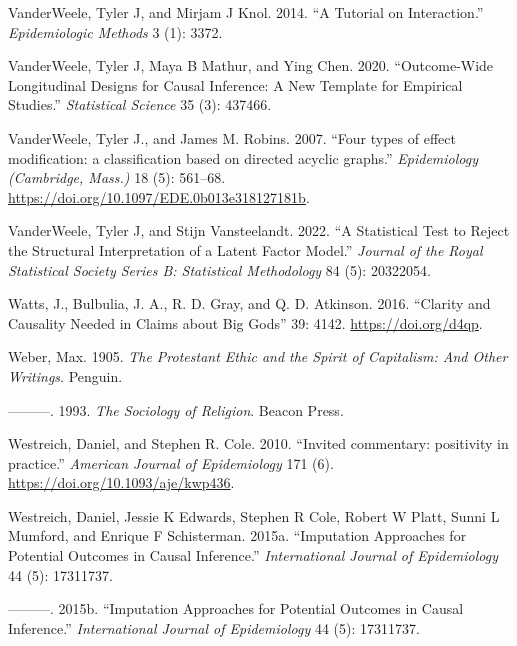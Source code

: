 \documentclass[
  singlecolumn]{report}
\newlength{\cslhangindent}
\newlength{\cslentryspacingunit} %
\newenvironment{CSLReferences}[2] %
 {%
  \setlength{\parindent}{0pt}
  \ifodd #1
  \let\oldpar\par
  \def\par{\hangindent=\cslhangindent\oldpar}
  \fi
  \setlength{\parskip}{#2\cslentryspacingunit}
 }%
 {}
\begin{document}
\begin{CSLReferences}{1}{0}
\leavevmode{}%
VanderWeele, Tyler J, and Mirjam J Knol. 2014. {``A Tutorial on
Interaction.''} \emph{Epidemiologic Methods} 3 (1): 3372.

\leavevmode{}%
VanderWeele, Tyler J, Maya B Mathur, and Ying Chen. 2020.
{``Outcome-Wide Longitudinal Designs for Causal Inference: A New
Template for Empirical Studies.''} \emph{Statistical Science} 35 (3):
437466.

\leavevmode{}%
VanderWeele, Tyler J., and James M. Robins. 2007. {``Four types of
effect modification: a classification based on directed acyclic
graphs.''} \emph{Epidemiology (Cambridge, Mass.)} 18 (5): 561--68.
\url{https://doi.org/10.1097/EDE.0b013e318127181b}.

\leavevmode{}%
VanderWeele, Tyler J, and Stijn Vansteelandt. 2022. {``A Statistical
Test to Reject the Structural Interpretation of a Latent Factor
Model.''} \emph{Journal of the Royal Statistical Society Series B:
Statistical Methodology} 84 (5): 20322054.

\leavevmode{}%
Watts, J., Bulbulia, J. A., R. D. Gray, and Q. D. Atkinson. 2016.
{``Clarity and Causality Needed in Claims about Big Gods''} 39: 4142.
\url{https://doi.org/d4qp}.

\leavevmode{}%
Weber, Max. 1905. \emph{The Protestant Ethic and the Spirit of
Capitalism: And Other Writings}. Penguin.

\leavevmode{}%
---------. 1993. \emph{The Sociology of Religion}. Beacon Press.

\leavevmode{}%
Westreich, Daniel, and Stephen R. Cole. 2010. {``Invited commentary:
positivity in practice.''} \emph{American Journal of Epidemiology} 171
(6). \url{https://doi.org/10.1093/aje/kwp436}.

\leavevmode{}%
Westreich, Daniel, Jessie K Edwards, Stephen R Cole, Robert W Platt,
Sunni L Mumford, and Enrique F Schisterman. 2015a. {``Imputation
Approaches for Potential Outcomes in Causal Inference.''}
\emph{International Journal of Epidemiology} 44 (5): 17311737.

\leavevmode{}%
---------. 2015b. {``Imputation Approaches for Potential Outcomes in
Causal Inference.''} \emph{International Journal of Epidemiology} 44
(5): 17311737.


\end{CSLReferences}
\end{document}
